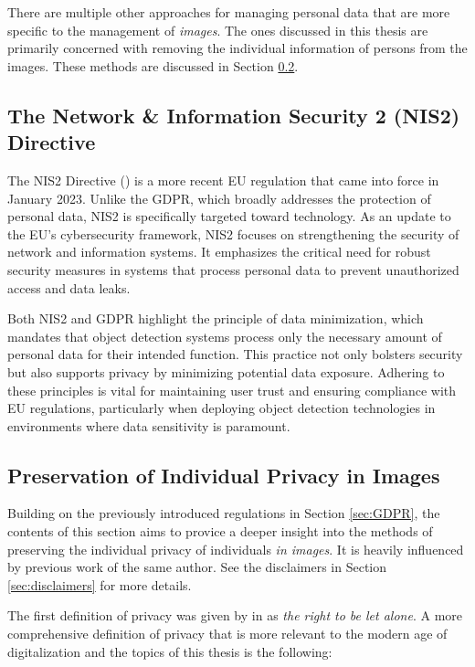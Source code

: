There are multiple other approaches for managing personal data that are more specific to the management of \textit{images}. The ones discussed in this thesis are primarily concerned with removing the individual information of persons from the images. These methods are discussed in Section \ref{sec:individual_privacy}. 

\subsection{The Network \& Information Security 2 (NIS2) Directive}
\label{sec:NIS2_relevance}
    
The NIS2 Directive (\cite{eu2022nis2}) is a more recent EU regulation that came into force in January 2023. Unlike the GDPR, which broadly addresses the protection of personal data, NIS2 is specifically targeted toward technology. As an update to the EU's cybersecurity framework, NIS2 focuses on strengthening the security of network and information systems. It emphasizes the critical need for robust security measures in systems that process personal data to prevent unauthorized access and data leaks.

Both NIS2 and GDPR highlight the principle of data minimization, which mandates that object detection systems process only the necessary amount of personal data for their intended function. This practice not only bolsters security but also supports privacy by minimizing potential data exposure. Adhering to these principles is vital for maintaining user trust and ensuring compliance with EU regulations, particularly when deploying object detection technologies in environments where data sensitivity is paramount.

\subsection{Preservation of Individual Privacy in Images}
\label{sec:individual_privacy}
Building on the previously introduced regulations in Section \ref{sec:GDPR}, the contents of this section aims to provice a deeper insight into the methods of preserving the individual privacy of individuals \textit{in images}. It is heavily influenced by previous work of the same author. See the disclaimers in Section \ref{sec:disclaimers} for more details.

The first definition of privacy was given by \citeauthor{br1890righttoprivacy} in \citeyear{br1890righttoprivacy} as \textit{the right to be let alone}. A more comprehensive definition of privacy that is more relevant to the modern age of digitalization and the topics of this thesis is the following:


